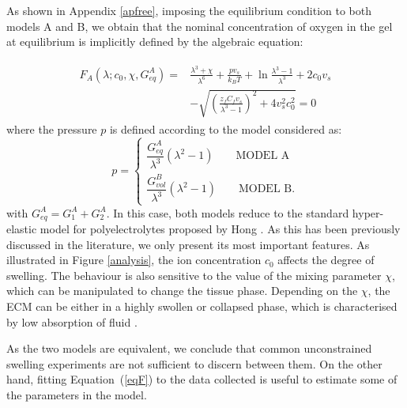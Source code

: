 \documentclass[runningheads]{llncs}
\begin{document}
As shown in Appendix \ref{apfree}, imposing the equilibrium condition to both models A and B, we obtain that the nominal concentration of oxygen in the gel at equilibrium is implicitly defined by the algebraic equation:

\begin{gather}
\begin{aligned}
F_{A}(\lambda; c_0,\chi,G^A_{eq})=&\frac{\lambda^3+\chi}{\lambda^6}+\frac{p v_s}{k_BT}+\ln \frac{\lambda^3-1}{\lambda^3} +2c_0v_s\\[1.5mm]
&-\sqrt{\left(\frac{z_fC_fv_s}{\lambda^3-1}\right)^2+4v_s^2c^2_0} =0 \label{eqF}
\end{aligned}
\end{gather}
where the pressure $p$ is defined according to the model considered as:
\begin{equation}
p = \begin{cases}
\dfrac{G^A_{eq}}{\lambda^3}(\lambda^2-1)\qquad \text{MODEL A}\\[10pt]
\dfrac{G^B_{vol}}{\lambda^3}(\lambda^2-1)\qquad \text{MODEL B}.
\end{cases}
\end{equation}
with $G^A_{eq}=G^A_1+G^A_2$. In this case, both models reduce to the standard hyper-elastic model for polyelectrolytes proposed by Hong \cite{Reviewpolyel}. As this has been previously discussed in the literature, we only present its most important features. As illustrated in Figure \ref{analysis}, the ion concentration $c_0$ affects the degree of swelling. The behaviour is also sensitive to the value of the mixing parameter $\chi$, which can be manipulated to change the tissue phase. Depending on the $\chi$, the ECM can be either in a highly swollen or collapsed phase, which is characterised by low absorption of fluid \cite{Salt}. 

As the two models are equivalent, we conclude that common unconstrained swelling experiments are not sufficient to discern between them. On the other hand, fitting Equation~(\ref{eqF}) to the data collected is useful to estimate some of the parameters in the model.

%

 
\newpage
\appendix
\end{document}

